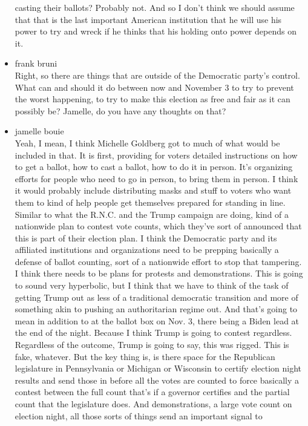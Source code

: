 \begin{itemize}
  casting their ballots? Probably not. And so I don't think we should
  assume that that is the last important American institution that he
  will use his power to try and wreck if he thinks that his holding onto
  power depends on it.
\item
  frank bruni\\
  Right, so there are things that are outside of the Democratic party's
  control. What can and should it do between now and November 3 to try
  to prevent the worst happening, to try to make this election as free
  and fair as it can possibly be? Jamelle, do you have any thoughts on
  that?
\item
  jamelle bouie\\
  Yeah, I mean, I think Michelle Goldberg got to much of what would be
  included in that. It is first, providing for voters detailed
  instructions on how to get a ballot, how to cast a ballot, how to do
  it in person. It's organizing efforts for people who need to go in
  person, to bring them in person. I think it would probably include
  distributing masks and stuff to voters who want them to kind of help
  people get themselves prepared for standing in line. Similar to what
  the R.N.C. and the Trump campaign are doing, kind of a nationwide plan
  to contest vote counts, which they've sort of announced that this is
  part of their election plan. I think the Democratic party and its
  affiliated institutions and organizations need to be prepping
  basically a defense of ballot counting, sort of a nationwide effort to
  stop that tampering. I think there needs to be plans for protests and
  demonstrations. This is going to sound very hyperbolic, but I think
  that we have to think of the task of getting Trump out as less of a
  traditional democratic transition and more of something akin to
  pushing an authoritarian regime out. And that's going to mean in
  addition to at the ballot box on Nov. 3, there being a Biden lead at
  the end of the night. Because I think Trump is going to contest
  regardless. Regardless of the outcome, Trump is going to say, this was
  rigged. This is fake, whatever. But the key thing is, is there space
  for the Republican legislature in Pennsylvania or Michigan or
  Wisconsin to certify election night results and send those in before
  all the votes are counted to force basically a contest between the
  full count that's if a governor certifies and the partial count that
  the legislature does. And demonstrations, a large vote count on
  election night, all those sorts of things send an important signal to

\end{itemize}
